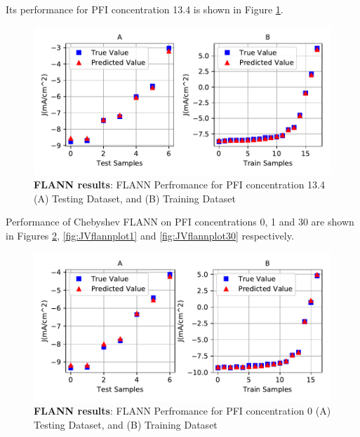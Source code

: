 \documentclass[]{article}
\begin{document}
Its performance for PFI concentration 13.4 is shown in Figure \ref{fig:JVflannplot134}.

\begin{figure}
\centering
\includegraphics{Report_files/figure-latex/JVflannplot134-1.pdf}
\caption{\label{fig:JVflannplot134}\textbf{FLANN results}: FLANN Perfromance for PFI concentration 13.4 (A) Testing Dataset, and (B) Training Dataset}
\end{figure}

Performance of Chebyshev FLANN on PFI concentrations 0, 1 and 30 are shown in Figures \ref{fig:JVflannplot0}, \ref{fig:JVflannplot1} and \ref{fig:JVflannplot30} respectively.

\begin{figure}
\centering
\includegraphics{Report_files/figure-latex/JVflannplot0-1.pdf}
\caption{\label{fig:JVflannplot0}\textbf{FLANN results}: FLANN Perfromance for PFI concentration 0 (A) Testing Dataset, and (B) Training Dataset}
\end{figure}
\end{document}
